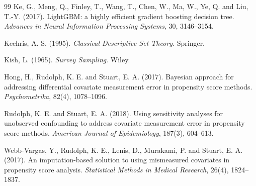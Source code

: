 \documentclass[11pt,a4paper]{article}
\theoremstyle{plain}
\theoremstyle{definition}
\begin{document}
\begin{thebibliography}{99}
 Ke, G., Meng, Q., Finley, T., Wang, T., Chen, W., Ma, W., Ye, Q. and Liu, T.-Y. (2017). LightGBM: a highly efficient gradient boosting decision tree. \emph{Advances in Neural Information Processing Systems}, 30, 3146--3154.

 Kechris, A. S. (1995). \emph{Classical Descriptive Set Theory}. Springer.

 Kish, L. (1965). \emph{Survey Sampling}. Wiley.

 Hong, H., Rudolph, K. E. and Stuart, E. A. (2017). Bayesian approach for addressing differential covariate measurement error in propensity score methods. \emph{Psychometrika}, 82(4), 1078--1096.

 Rudolph, K. E. and Stuart, E. A. (2018). Using sensitivity analyses for unobserved confounding to address covariate measurement error in propensity score methods. \emph{American Journal of Epidemiology}, 187(3), 604--613.

 Webb-Vargas, Y., Rudolph, K. E., Lenis, D., Murakami, P. and Stuart, E. A. (2017). An imputation-based solution to using mismeasured covariates in propensity score analysis. \emph{Statistical Methods in Medical Research}, 26(4), 1824--1837.

\end{thebibliography}
\end{document}
